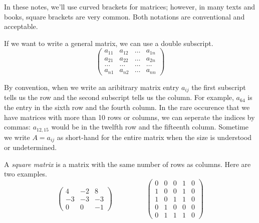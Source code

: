 \documentclass[fleqn]{report}
\begin{document}
In these notes, we'll use curved brackets for matrices;
however, in many texts and books, square brackets
are very common. Both notations are conventional and
acceptable.

If we want to write a general matrix, we can use a double
subscript.
\begin{displaymath}
\left(
\begin{array}{cccc}
a_{11} & a_{12} & \ldots & a_{1n} \\
a_{21} & a_{22} & \ldots & a_{2n} \\
\ldots & \ldots & \ldots & \ldots \\
a_{n1} & a_{n2} & \ldots & a_{nn} 
\end{array}
\right)
\end{displaymath}

By convention, when we write an aribitrary matrix entry $a_{ij}$
the first subscript tells us the row and the second subscript tells us
the column. For example, $a_{64}$ is the entry in the sixth row
and the fourth column. In the rare occurence that we have
matrices with more than 10 rows or columns, we can seperate the
indices by commas: $a_{12,15}$ would be in the twelfth row and
the fifteenth column. Sometime we write $A = a_{ij}$ as short-hand
for the entire matrix when the size is understood or
undetermined. 

\begin{defn}
A \emph{square matrix} is a matrix with the same number of rows
as columns. Here are two examples.
\begin{displaymath}
\left(
\begin{matrix}
4 & -2 & 8 \\
-3 & -3 & -3 \\
0 & 0 & -1 
\end{matrix}
\right)
\hspace{2cm}
\left(
\begin{matrix}
0 & 0 & 0 & 1 & 0 \\
1 & 0 & 0 & 1 & 0 \\
1 & 0 & 1 & 1 & 0 \\
0 & 1 & 0 & 0 & 0 \\
0 & 1 & 1 & 1 & 0
\end{matrix}
\right)
\end{displaymath}
\end{defn}
\end{document}
